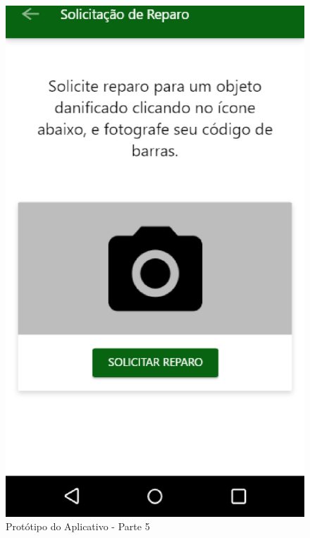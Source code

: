 \begin{anexosenv}
\begin{figure}[!h]
  \centering
  \includegraphics[keepaspectratio=true,scale=0.6]{figuras/prot-4.eps}
  \caption{Protótipo do Aplicativo - Parte 5}
\end{figure}


\end{anexosenv}
